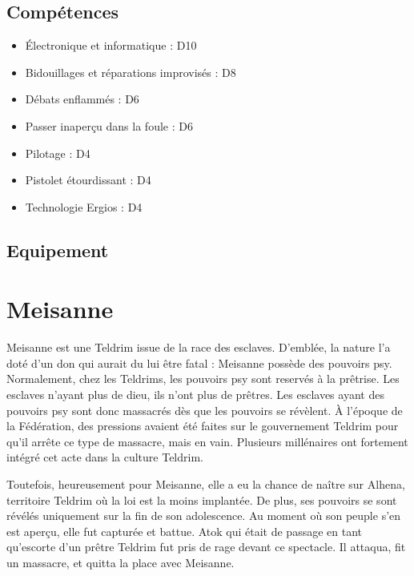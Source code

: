 \begin{multicols}{2}
\section*{Compétences}

\begin{itemize}
\item Électronique et informatique : D10
\item Bidouillages et réparations improvisés : D8
\item Débats enflammés : D6
\item Passer inaperçu dans la foule : D6
\item Pilotage : D4
\item Pistolet étourdissant : D4
\item Technologie Ergios : D4
\end{itemize}

\section*{Equipement}

\end{multicols}

\clearpage

\chapter*{Meisanne}

Meisanne est une Teldrim issue de la race des esclaves. D'emblée, la nature l'a doté d'un don qui aurait du lui être fatal : Meisanne possède des pouvoirs psy. Normalement, chez les Teldrims, les pouvoirs psy sont reservés à la prêtrise. Les esclaves n'ayant plus de dieu, ils n'ont plus de prêtres. Les esclaves ayant des pouvoirs psy sont donc massacrés dès que les pouvoirs se révèlent. À l'époque de la Fédération, des pressions avaient été faites sur le gouvernement Teldrim pour qu'il arrête ce type de massacre, mais en vain. Plusieurs millénaires ont fortement intégré cet acte dans la culture Teldrim.

Toutefois, heureusement pour Meisanne, elle a eu la chance de naître sur Alhena, territoire Teldrim où la loi est la moins implantée. De plus, ses pouvoirs se sont révélés uniquement sur la fin de son adolescence. Au moment où son peuple s'en est aperçu, elle fut capturée et battue. Atok qui était de passage en tant qu'escorte d'un prêtre Teldrim fut pris de rage devant ce spectacle. Il attaqua, fit un massacre, et quitta la place avec Meisanne.

